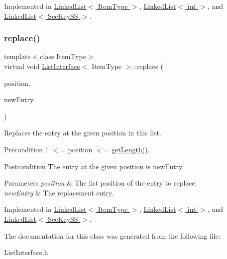 Implemented in \hyperlink{classLinkedList_a008e916c3d51d28b4cc9c8cdf3e9d921}{Linked\+List$<$ Item\+Type $>$}, \hyperlink{classLinkedList_a008e916c3d51d28b4cc9c8cdf3e9d921}{Linked\+List$<$ int $>$}, and \hyperlink{classLinkedList_a008e916c3d51d28b4cc9c8cdf3e9d921}{Linked\+List$<$ Sec\+Key\+S\+S $>$}.

\mbox{\label{classListInterface_aae877a56b7b9f5f526c37a00e234fad1}} 
\subsubsection{\texorpdfstring{replace()}{replace()}}
{\footnotesize\ttfamily template$<$class Item\+Type$>$ \\
virtual void \hyperlink{classListInterface}{List\+Interface}$<$ Item\+Type $>$\+::replace (\begin{DoxyParamCaption}\item[{int}]{position,  }\item[{const Item\+Type \&}]{new\+Entry }\end{DoxyParamCaption})\hspace{0.3cm}{\ttfamily [pure virtual]}}

Replaces the entry at the given position in this list. \begin{DoxyPrecond}{Precondition}
1 $<$= position $<$= \hyperlink{classListInterface_afc85695d4137f1e29ff02e179c9f3221}{get\+Length()}. 
\end{DoxyPrecond}
\begin{DoxyPostcond}{Postcondition}
The entry at the given position is new\+Entry. 
\end{DoxyPostcond}

\begin{DoxyParams}{Parameters}
{\em position} & The list position of the entry to replace. \\
\hline
{\em new\+Entry} & The replacement entry. \\
\hline
\end{DoxyParams}


Implemented in \hyperlink{classLinkedList_a3035f880c50e7d8f68e67c093d4607ca}{Linked\+List$<$ Item\+Type $>$}, \hyperlink{classLinkedList_a3035f880c50e7d8f68e67c093d4607ca}{Linked\+List$<$ int $>$}, and \hyperlink{classLinkedList_a3035f880c50e7d8f68e67c093d4607ca}{Linked\+List$<$ Sec\+Key\+S\+S $>$}.



The documentation for this class was generated from the following file\+:\begin{DoxyCompactItemize}
\item 
List\+Interface.\+h\end{DoxyCompactItemize}
